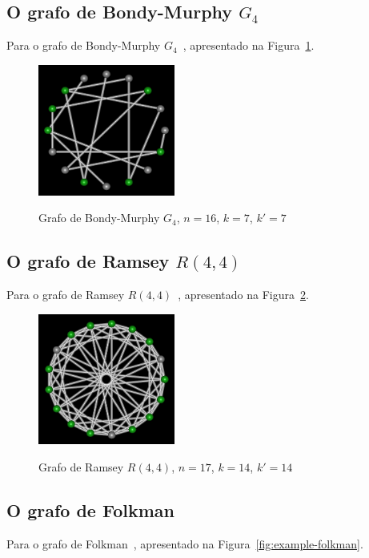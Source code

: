 \subsection{O grafo de Bondy-Murphy $G_4$}
Para o grafo de Bondy-Murphy $G_4$~\cite{cite:example-bondy},
apresentado na Figura~\ref{fig:example-bondymurphyg4}.

\begin{figure}[htb]
\centering
\includegraphics[width=0.4\textwidth]{img/bondymurphyg4.png}
\label{fig:example-bondymurphyg4}
\caption{Grafo de Bondy-Murphy $G_4$, $n=16$, $k=7$, $k'=7$}
\end{figure}


\subsection{O grafo de Ramsey $R(4,4)$}
Para o grafo de Ramsey $R(4,4)$~\cite{cite:example-ramsey},
apresentado na Figura~\ref{fig:example-ramsey}.

\begin{figure}[htb]
\centering
\includegraphics[width=0.4\textwidth]{img/ramsey.png}
\label{fig:example-ramsey}
\caption{Grafo de Ramsey $R(4,4)$, $n=17$, $k=14$, $k'=14$}
\end{figure}


\subsection{O grafo de Folkman}
Para o grafo de Folkman~\cite{cite:example-folkman},
apresentado na Figura~\ref{fig:example-folkman}.

